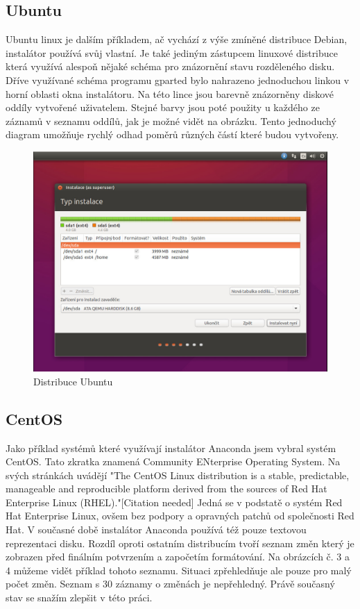 \documentclass[a4paper]{article}
\begin{document}
\subsection{Ubuntu}

Ubuntu linux je dalším příkladem, ač vychází z výše zmíněné distribuce Debian, instalátor používá svůj vlastní. Je také jediným zástupcem linuxové distribuce která využívá alespoň nějaké schéma 
pro znázornění stavu rozděleného disku. Dříve využívané schéma programu gparted bylo nahrazeno jednoduchou linkou v horní oblasti okna instalátoru. Na této lince jsou barevně znázorněny diskové 
oddíly vytvořené uživatelem. Stejné barvy jsou poté použity u každého ze záznamů v seznamu oddílů, jak je možné vidět na obrázku. Tento jednoduchý diagram umožňuje rychlý odhad poměrů různých 
částí které budou vytvořeny.

\begin{figure}
\label{fig:ubuntu}
\caption{Distribuce Ubuntu}
\centering
\includegraphics[width=.8\columnwidth]{pics/ubuntu1.jpg}
\end{figure}

\subsection{CentOS}

Jako příklad systémů které využívají instalátor Anaconda jsem vybral systém CentOS. Tato zkratka znamená Community ENterprise Operating System. Na svých stránkách uvádějí "The CentOS Linux
distribution is a stable, predictable, manageable and reproducible platform derived from the sources of Red Hat Enterprise Linux (RHEL)."[Citation needed] Jedná se v podstatě o systém Red Hat Enterprise 
Linux, ovšem bez podpory a opravných patchů od společnosti Red Hat. V současné době instalátor Anaconda používá též pouze textovou reprezentaci disku. Rozdíl oproti ostatním distribucím tvoří 
seznam změn který je zobrazen před finálním potvrzením a započetím formátování. Na obrázcích č. 3 a 4 můžeme vidět příklad tohoto seznamu. Situaci zpřehledňuje ale pouze pro malý počet změn. Seznam s 30 
záznamy o změnách je nepřehledný. Právě současný stav se snažím zlepšit v této práci.
\end{document}
